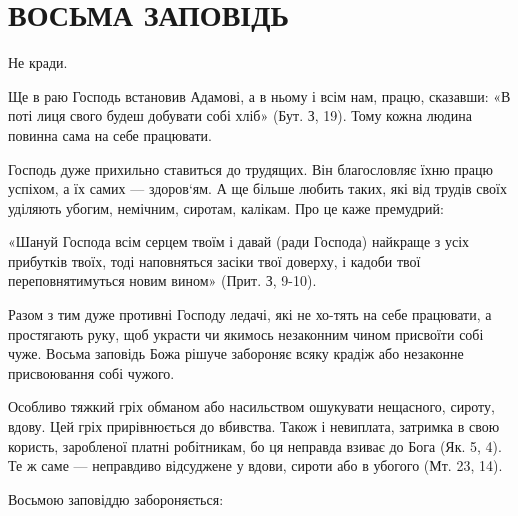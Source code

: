 \documentclass[main.tex]{subfiles}
\begin{document}
\section{ВОСЬМА ЗАПОВІДЬ}

Не кради.

Ще в раю Господь встановив Адамові, а в ньому і всім нам, працю, сказавши: «В поті лиця свого будеш добувати собі хліб» (Бут. З, 19). Тому кожна людина повинна сама на себе працювати.

Господь дуже прихильно ставиться до трудящих. Він благословляє їхню працю успіхом, а їх самих — здоров`ям. А ще більше любить таких, які від трудів своїх уділяють убогим, немічним, сиротам, калікам. Про це каже премудрий:

«Шануй Господа всім серцем твоїм і давай (ради Господа) найкраще з усіх прибутків твоїх, тоді наповняться засіки твої доверху, і кадоби твої переповнятимуться новим вином» (Прит. З, 9-10).

Разом з тим дуже противні Господу ледачі, які не хо-тять на себе працювати, а простягають руку, щоб украсти чи якимось незаконним чином присвоїти собі чуже. Восьма заповідь Божа рішуче забороняє всяку крадіж або незаконне присвоювання собі чужого.

Особливо тяжкий гріх обманом або насильством ошукувати нещасного, сироту, вдову. Цей гріх прирівнюється до вбивства. Також і невиплата, затримка в свою користь, заробленої платні робітникам, бо ця неправда взиває до Бога (Як. 5, 4). Те ж саме — неправдиво відсуджене у вдови, сироти або в убогого (Мт. 23, 14).

Восьмою заповіддю забороняється:
\end{document}
